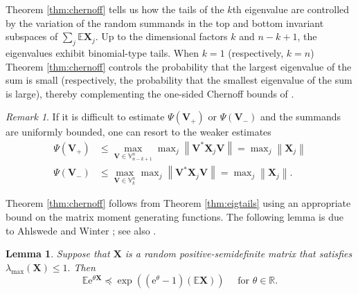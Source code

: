 \documentclass[11pt,letterpaper,twoside,reqno,nosumlimits]{amsart}
\renewcommand{\star}{*}
\newcommand{\mat}[1]{\ensuremath{\bm{#1}}} %
\newcommand{\e}{\ensuremath{\mathrm{e}}}
\newcommand{\E}{\ensuremath{\mathbb{E}}}
\newcommand{\Prob}[1]{\ensuremath{\mathbb{P}\left\{#1\right\}}}
\newcommand{\R}{\ensuremath{\mathbb{R}}}
\newcommand{\randcon}{\ensuremath{\Psi}}
\newcommand{\norm}[1]{\ensuremath{\left\|#1\right\|}}
\newcommand{\lambdamax}[1]{\ensuremath{\lambda_{\mathrm{max}}\left(#1\right)}}
\newcommand{\Isom}[2]{\ensuremath{\mathbb{V}_{#1}^{#2}}}
\newtheorem{lemma}[thm]{Lemma}
\theoremstyle{remark}
\newtheorem{remark}{Remark}
\numberwithin{equation}{section}
\numberwithin{thm}{section}
\numberwithin{prop}{section}
\numberwithin{defn}{section}
\numberwithin{remark}{section}
\begin{document}
Theorem \ref{thm:chernoff} tells us how the tails of the $k$th eigenvalue are controlled by the variation of the random summands in the top and bottom invariant subspaces of $\sum_j \E \mat{X}_j.$ Up to the dimensional factors $k$ and $n-k+1$, the eigenvalues exhibit binomial-type tails. When $k=1$ (respectively, $k=n$) Theorem \ref{thm:chernoff} controls the probability that the largest eigenvalue of the sum is small (respectively, the probability that the smallest eigenvalue of the sum is large), thereby complementing the one-sided Chernoff bounds of \cite{T10a}.


\begin{remark}
If it is difficult to estimate $\randcon(\mat{V}_+)$ or $\randcon(\mat{V}_{-})$ and the summands are uniformly bounded, one can resort to the weaker estimates
\begin{align*}
	\randcon(\mat{V}_{+}) & \leq \max_{\mat{V} \in \Isom{n-k+1}{n}} \max\nolimits_j \norm{\mat{V}^\star \mat{X}_j \mat{V}} = \max\nolimits_j \norm{\mat{X}_j} \\
	\randcon(\mat{V}_{-}) & \leq \max_{\mat{V} \in \Isom{k}{n}} \max\nolimits_j \norm{\mat{V}^\star \mat{X}_j \mat{V}} = \max\nolimits_j \norm{\mat{X}_j}.
\end{align*}
\end{remark}

Theorem \ref{thm:chernoff} follows from Theorem \ref{thm:eigtails} using an appropriate bound on the matrix moment generating functions. The following lemma is due to Ahlswede and Winter \cite{AW02}; see also \cite[Lem.~5.8]{T10a}.

\begin{lemma}
Suppose that $\mat{X}$ is a random positive-semidefinite matrix that satisfies $\lambdamax{\mat{X}} \leq 1.$ Then
$$ \E \e^{\theta \mat{X}} \preceq \exp\left( (\e^\theta - 1) (\E\mat{X}) \right) \quad \text{ for } \theta \in \R. $$
\label{lemma:chernoffmgf}
\end{lemma}
\end{document}
